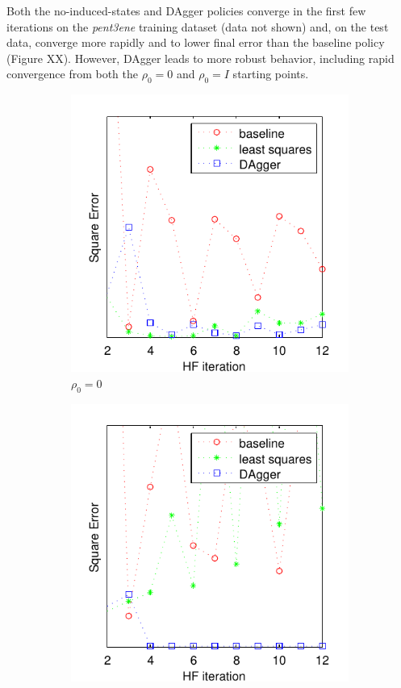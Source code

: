 \documentclass[twoside,11pt]{article}
\begin{document}
Both the no-induced-states and DAgger policies converge in the first few iterations on the \textit{pent3ene} training dataset (data not shown) and, on the test data, converge more rapidly and to lower final error than the baseline policy (Figure XX). However, DAgger leads to more robust behavior, including rapid convergence from both the  $\rho_0 = 0$ and $\rho_0 = I$ starting points.

\begin{figure}[h!]
\centering
\begin{subfigure}{.5\textwidth}
  \centering
  \includegraphics[scale=0.7]{propylsub_pzero_test_12iter.pdf}
  \caption{$\rho_0 = 0$}
  \label{fig:propSub0}
\end{subfigure}%
\begin{subfigure}{.5\textwidth}
  \centering
  \includegraphics[scale=0.7]{propylsub_peye_test_12iter.pdf}

\end{subfigure}
\end{figure}
\end{document}
